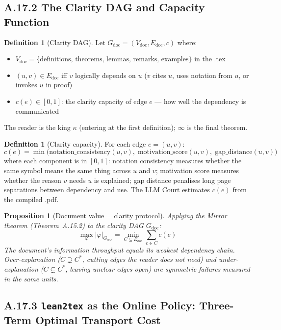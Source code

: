 \documentclass[11pt,a4paper]{article}
\newtheorem{proposition}[theorem]{Proposition}
\theoremstyle{definition}
\newtheorem{definition}[theorem]{Definition}
\theoremstyle{remark}
\begin{document}
\subsection{A.17.2 The Clarity DAG and Capacity Function}

\begin{definition}[Clarity DAG]\label{def:clarity_dag}
Let $G_{\mathrm{doc}} = (V_{\mathrm{doc}}, E_{\mathrm{doc}}, c)$ where:
\begin{itemize}[nosep]
  \item $V_{\mathrm{doc}} = \{\text{definitions, theorems, lemmas, remarks, examples}\}$ in the .tex
  \item $(u,v) \in E_{\mathrm{doc}}$ iff $v$ logically depends on $u$ ($v$ cites $u$, uses notation from $u$, or invokes $u$ in proof)
  \item $c(e) \in [0,1]$: the clarity capacity of edge $e$ --- how well the dependency is communicated
\end{itemize}
The reader is the king $\kappa$ (entering at the first definition); $\infty$ is the final theorem.
\end{definition}

\begin{definition}[Clarity capacity]\label{def:clarity_cap}
For each edge $e = (u,v)$:
\[
  c(e) = \min\bigl(\text{notation\_consistency}(u,v),\; \text{motivation\_score}(u,v),\; \text{gap\_distance}(u,v)\bigr)
\]
where each component is in $[0,1]$: notation consistency measures whether the same symbol means the same thing across $u$ and $v$; motivation score measures whether the reason $v$ needs $u$ is explained; gap distance penalises long page separations between dependency and use. The LLM Court estimates $c(e)$ from the compiled .pdf.
\end{definition}

\begin{proposition}[Document value = clarity protocol]\label{prop:doc_mirror}
Applying the Mirror theorem (Theorem~A.15.2) to the clarity DAG $G_{\mathrm{doc}}$:
\[
  \max_\varphi |\varphi|_{G_{\mathrm{doc}}} = \min_{C \subseteq E_{\mathrm{doc}}} \sum_{e \in C} c(e)
\]
The document's information throughput equals its weakest dependency chain.
Over-explanation ($C \supsetneq C^*$, cutting edges the reader does not need) and
under-explanation ($C \subsetneq C^*$, leaving unclear edges open) are symmetric
failures measured in the same units.
\end{proposition}


\subsection{A.17.3 \texttt{lean2tex} as the Online Policy: Three-Term Optimal Transport Cost}
\end{document}
